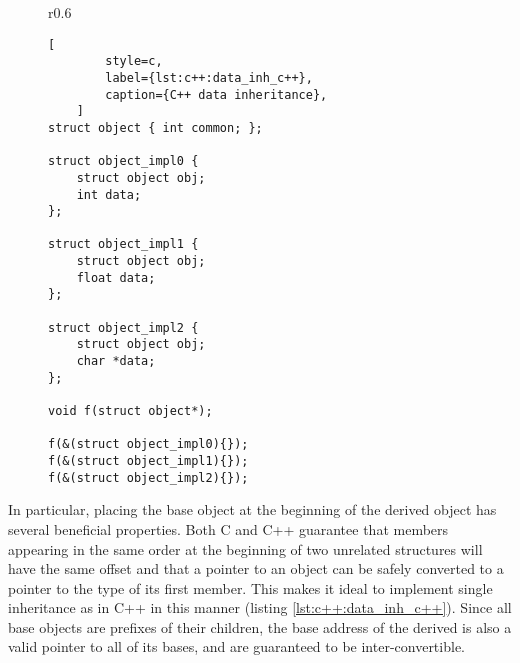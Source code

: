 \begin{figure}[ht]
    \begin{wrapfigure}{r}{0.6\textwidth}
        \centering
    \end{wrapfigure}
    \begin{lstlisting}[
        style=c,
        label={lst:c++:data_inh_c++},
        caption={C++ data inheritance},
    ]
struct object { int common; };

struct object_impl0 {
    struct object obj;
    int data;
};

struct object_impl1 {
    struct object obj;
    float data;
};

struct object_impl2 {
    struct object obj;
    char *data;
};

void f(struct object*);

f(&(struct object_impl0){});
f(&(struct object_impl1){});
f(&(struct object_impl2){});
    \end{lstlisting}
\end{figure}

In particular, placing the base object at the beginning of the derived object
has several beneficial properties.  Both C and C++ guarantee that members
appearing in the same order at the beginning of two unrelated structures will
have the same offset and that a pointer to an object can be safely converted to
a pointer to the type of its first member\footnotemark.  This makes it ideal to
implement single inheritance as in C++ in this manner (listing
\ref{lst:c++:data_inh_c++}).  Since all base objects are prefixes of their
children, the base address of the derived is also a valid pointer to all of its
bases, and are guaranteed to be inter-convertible.

